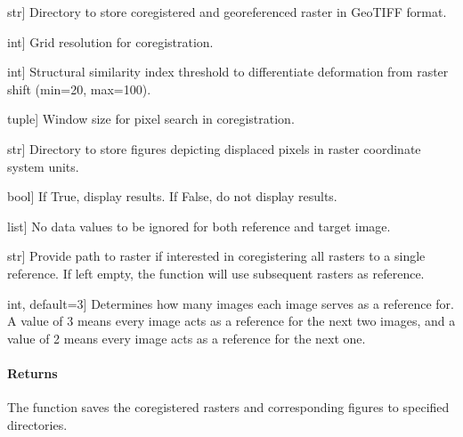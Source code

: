 \documentclass[letterpaper,10pt,english]{sphinxmanual}
\begin{document}
\begin{fulllineitems}
\begin{description}
\sphinxlineitem{output\_folder}{[}str{]}
\sphinxAtStartPar
Directory to store coregistered and georeferenced raster in GeoTIFF format.

\sphinxlineitem{grid\_res}{[}int{]}
\sphinxAtStartPar
Grid resolution for coregistration.

\sphinxlineitem{min\_reliability}{[}int{]}
\sphinxAtStartPar
Structural similarity index threshold to differentiate deformation from raster shift (min=20, max=100).

\sphinxlineitem{window\_size}{[}tuple{]}
\sphinxAtStartPar
Window size for pixel search in coregistration.

\sphinxlineitem{path\_figures}{[}str{]}
\sphinxAtStartPar
Directory to store figures depicting displaced pixels in raster coordinate system units.

\sphinxlineitem{showFig}{[}bool{]}
\sphinxAtStartPar
If True, display results. If False, do not display results.

\sphinxlineitem{no\_data}{[}list{]}
\sphinxAtStartPar
No data values to be ignored for both reference and target image.

\sphinxlineitem{single\_ref\_path}{[}str{]}
\sphinxAtStartPar
Provide path to raster if interested in coregistering all rasters to a single reference. 
If left empty, the function will use subsequent rasters as reference.

\sphinxlineitem{step\_size}{[}int, default=3{]}
\sphinxAtStartPar
Determines how many images each image serves as a reference for. A value of 3 means every image 
acts as a reference for the next two images, and a value of 2 means every image acts as a reference for the next one.

\end{description}


\paragraph{Returns}
\label{\detokenize{akhdefo_functions:id6}}\begin{description}
\sphinxAtStartPar
The function saves the coregistered rasters and corresponding figures to specified directories.

\end{description}

\end{fulllineitems}

\end{document}
